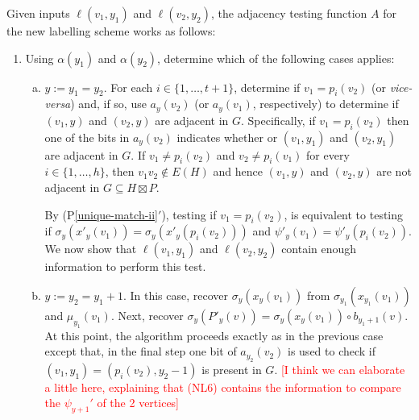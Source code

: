 \documentclass{patmorin}
\newcommand{\psref}[1]{(P\ref{#1}$'$)}
\begin{document}
Given inputs $\ell(v_1,y_1)$ and $\ell(v_2,y_2)$, the adjacency testing function $A$ for the new labelling scheme works as follows:
\begin{enumerate}
    \item Using $\alpha(y_1)$ and $\alpha(y_2)$, determine which of the following cases applies:
    \begin{enumerate}[(a)]
        \item $y:=y_1=y_2$.  For each $i\in\{1,\ldots,t+1\}$, determine if $v_1=p_i(v_2)$ (or \textit{vice-versa}) and, if so, use $a_y(v_2)$ (or $a_y(v_1)$, respectively) to determine if $(v_1,y)$ and $(v_2,y)$ are adjacent in $G$. Specifically, if $v_1=p_i(v_2)$ then one of the bits in $a_y(v_2)$ indicates whether or $(v_1,y_1)$ and $(v_2,y_1)$ are adjacent in $G$. If $v_1\neq p_i(v_2)$ and $v_2\neq p_i(v_1)$ for every $i\in\{1,\ldots,h\}$, then $v_1v_2\not\in E(H)$ and hence $(v_1,y)$ and $(v_2,y)$ are not adjacent in $G\subseteq H\boxtimes P$.

        By \psref{unique-match-ii}, testing if $v_1=p_i(v_2)$, is equivalent to testing if $\sigma_y(x'_y(v_1))=\sigma_y(x'_y(p_i(v_2)))$ and $\psi'_y(v_1)=\psi'_y(p_i(v_2))$. We now show that $\ell(v_1,y_1)$ and $\ell(v_2,y_2)$ contain enough information to perform this test.

        \item $y:=y_2=y_1+1$.  In this case, recover $\sigma_y(x_y(v_1))$ from $\sigma_{y_1}(x_{y_1}(v_1))$ and $\mu_{y_1}(v_1)$.  Next, recover $\sigma_y(P'_y(v))=\sigma_y(x_y(v_1))\mathbin{\circ}b_{y_1+1}(v)$. At this point, the algorithm proceeds exactly as in the previous case except that, in the final step one bit of $a_{y_2}(v_2)$ is used to check if $(v_1,y_1)=(p_i(v_2),y_2-1)$ is present in $G$.  \textcolor{red}{[I think we can elaborate a little here, explaining that (NL6) contains the information to compare the $\psi_{y+1}'$ of the 2 vertices]}


\end{enumerate}
\end{enumerate}
\end{document}
